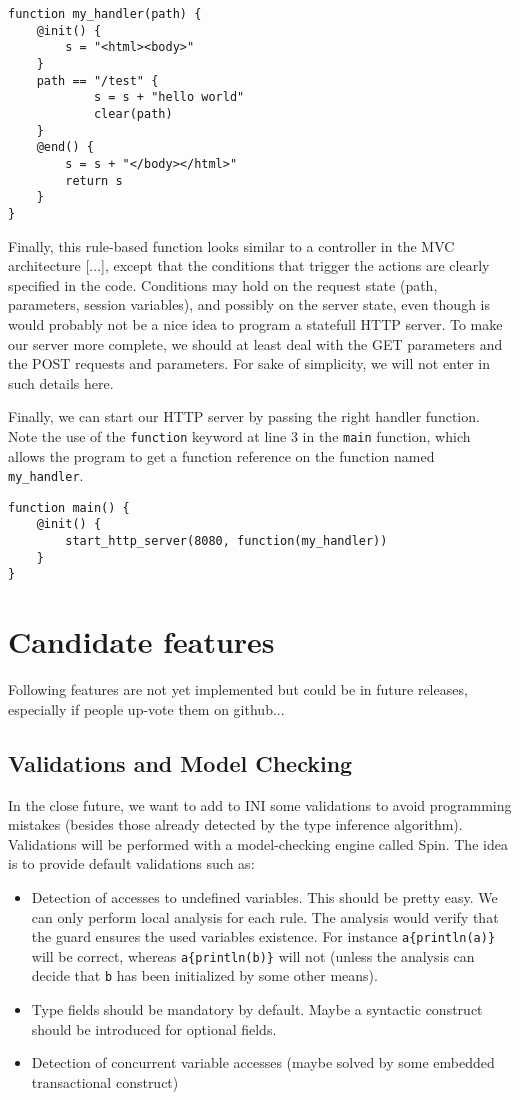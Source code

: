 \documentclass[11pt]{article}
\begin{document}
\begin{lstlisting}
function my_handler(path) {
	@init() {
		s = "<html><body>"
	}
	path == "/test" {
			s = s + "hello world"
			clear(path)
	}
	@end() {
		s = s + "</body></html>"
		return s
	}
}
\end{lstlisting}

Finally, this rule-based function looks similar to a controller in the MVC architecture [...], except that the conditions that trigger the actions are clearly specified in the code. Conditions may hold on the request state (path, parameters, session variables), and possibly on the server state, even though is would probably not be a nice idea to program a statefull HTTP server. To make our server more complete, we should at least deal with the GET parameters and the POST requests and parameters. For sake of simplicity, we will not enter in such details here.

Finally, we can start our HTTP server by passing the right handler function. Note the use of the \texttt{function} keyword at line 3 in the \texttt{main} function, which allows the program to get a function reference on the function named \texttt{my\_handler}.

\begin{lstlisting}
function main() {
	@init() {
		start_http_server(8080, function(my_handler))
	}
}
\end{lstlisting}

\section{Candidate features}

Following features are not yet implemented but could be in future releases, especially if people up-vote them on github...

\subsection{Validations and Model Checking}

In the close future, we want to add to INI some validations to avoid programming mistakes (besides those already detected by the type inference algorithm). Validations will be performed with a model-checking engine called Spin. The idea is to provide default validations such as:

\begin{itemize}
\item Detection of accesses to undefined variables. This should be pretty easy. We can only perform local analysis for each rule. The analysis would verify that the guard ensures the used variables existence. For instance \texttt{a\{println(a)\}} will be correct, whereas \texttt{a\{println(b)\}} will not (unless the analysis can decide that \texttt{b} has been initialized by some other means).
\item Type fields should be mandatory by default. Maybe a syntactic construct should be introduced for optional fields.
\item Detection of concurrent variable accesses (maybe solved by some embedded transactional construct)
\end{itemize}
\end{document}

